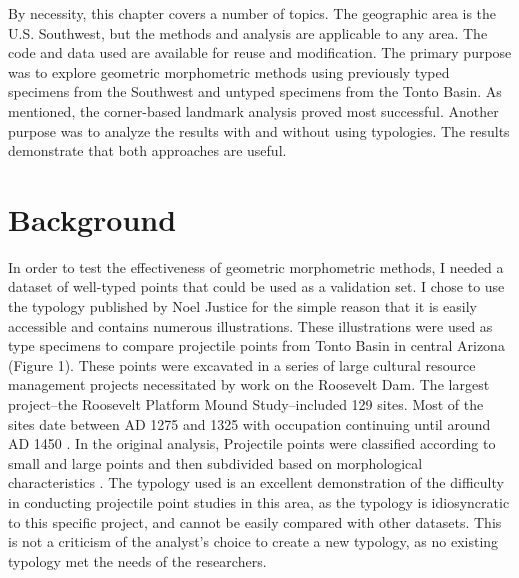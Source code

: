 \documentclass[a4paper]{article}
\begin{document}
By necessity, this chapter covers a number of topics. The geographic area is the U.S. Southwest, but the methods and analysis are applicable to any area. The code and data used are available for reuse and modification. The primary purpose was to explore geometric morphometric methods using previously typed specimens from the Southwest and untyped specimens from the Tonto Basin. As mentioned, the corner-based landmark analysis proved most successful. Another purpose was to analyze the results with and without using typologies. The results demonstrate that both approaches are useful.

\hypertarget{background}{%
\section*{Background}\label{background}}

In order to test the effectiveness of geometric morphometric methods, I needed a dataset of well-typed points that could be used as a validation set. I chose to use the typology published by Noel Justice \autocite*{Justice2002-cf} for the simple reason that it is easily accessible and contains numerous illustrations. These illustrations were used as type specimens to compare projectile points from Tonto Basin in central Arizona (Figure 1). These points were excavated in a series of large cultural resource management projects necessitated by work on the Roosevelt Dam. The largest project--the Roosevelt Platform Mound Study--included 129 sites. Most of the sites date between AD 1275 and 1325 with occupation continuing until around AD 1450 \autocite{Rice1998-ku}. In the original analysis, Projectile points were classified according to small and large points and then subdivided based on morphological characteristics \autocite[p.727]{Rice1994-rk}. The typology used is an excellent demonstration of the difficulty in conducting projectile point studies in this area, as the typology is idiosyncratic to this specific project, and cannot be easily compared with other datasets. This is not a criticism of the analyst's choice to create a new typology, as no existing typology met the needs of the researchers.
\end{document}
